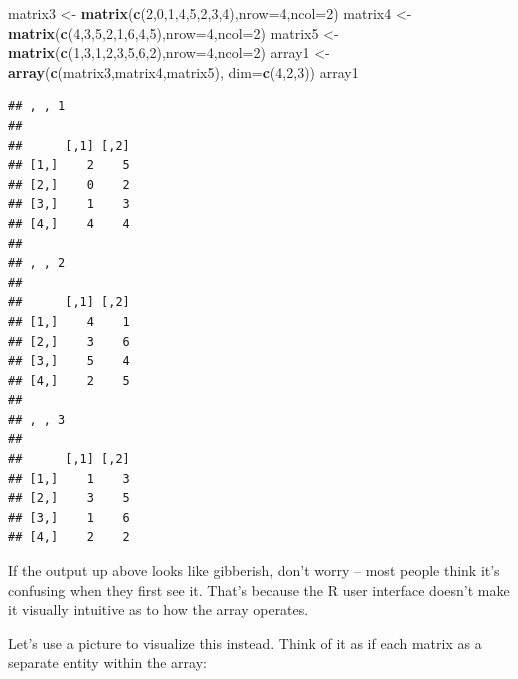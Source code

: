 \documentclass[
]{book}
\newenvironment{Shaded}{\begin{snugshade}}{\end{snugshade}}
\newcommand{\DataTypeTok}[1]{\textcolor[rgb]{0.13,0.29,0.53}{#1}}
\newcommand{\DecValTok}[1]{\textcolor[rgb]{0.00,0.00,0.81}{#1}}
\newcommand{\KeywordTok}[1]{\textcolor[rgb]{0.13,0.29,0.53}{\textbf{#1}}}
\newcommand{\NormalTok}[1]{#1}
\newcommand{\StringTok}[1]{\textcolor[rgb]{0.31,0.60,0.02}{#1}}
\begin{document}
\begin{Shaded}
\begin{Highlighting}[]
\NormalTok{matrix3 <-}\StringTok{ }\KeywordTok{matrix}\NormalTok{(}\KeywordTok{c}\NormalTok{(}\DecValTok{2}\NormalTok{,}\DecValTok{0}\NormalTok{,}\DecValTok{1}\NormalTok{,}\DecValTok{4}\NormalTok{,}\DecValTok{5}\NormalTok{,}\DecValTok{2}\NormalTok{,}\DecValTok{3}\NormalTok{,}\DecValTok{4}\NormalTok{),}\DataTypeTok{nrow=}\DecValTok{4}\NormalTok{,}\DataTypeTok{ncol=}\DecValTok{2}\NormalTok{)}
\NormalTok{matrix4 <-}\StringTok{ }\KeywordTok{matrix}\NormalTok{(}\KeywordTok{c}\NormalTok{(}\DecValTok{4}\NormalTok{,}\DecValTok{3}\NormalTok{,}\DecValTok{5}\NormalTok{,}\DecValTok{2}\NormalTok{,}\DecValTok{1}\NormalTok{,}\DecValTok{6}\NormalTok{,}\DecValTok{4}\NormalTok{,}\DecValTok{5}\NormalTok{),}\DataTypeTok{nrow=}\DecValTok{4}\NormalTok{,}\DataTypeTok{ncol=}\DecValTok{2}\NormalTok{)}
\NormalTok{matrix5 <-}\StringTok{ }\KeywordTok{matrix}\NormalTok{(}\KeywordTok{c}\NormalTok{(}\DecValTok{1}\NormalTok{,}\DecValTok{3}\NormalTok{,}\DecValTok{1}\NormalTok{,}\DecValTok{2}\NormalTok{,}\DecValTok{3}\NormalTok{,}\DecValTok{5}\NormalTok{,}\DecValTok{6}\NormalTok{,}\DecValTok{2}\NormalTok{),}\DataTypeTok{nrow=}\DecValTok{4}\NormalTok{,}\DataTypeTok{ncol=}\DecValTok{2}\NormalTok{)}
\NormalTok{array1 <-}\StringTok{ }\KeywordTok{array}\NormalTok{(}\KeywordTok{c}\NormalTok{(matrix3,matrix4,matrix5),}
                \DataTypeTok{dim=}\KeywordTok{c}\NormalTok{(}\DecValTok{4}\NormalTok{,}\DecValTok{2}\NormalTok{,}\DecValTok{3}\NormalTok{))}
\NormalTok{array1}
\end{Highlighting}
\end{Shaded}

\begin{verbatim}
## , , 1
## 
##      [,1] [,2]
## [1,]    2    5
## [2,]    0    2
## [3,]    1    3
## [4,]    4    4
## 
## , , 2
## 
##      [,1] [,2]
## [1,]    4    1
## [2,]    3    6
## [3,]    5    4
## [4,]    2    5
## 
## , , 3
## 
##      [,1] [,2]
## [1,]    1    3
## [2,]    3    5
## [3,]    1    6
## [4,]    2    2
\end{verbatim}

If the output up above looks like gibberish, don't worry -- most people think it's confusing when they first see it. That's because the R user interface doesn't make it visually intuitive as to how the array operates.

Let's use a picture to visualize this instead. Think of it as if each matrix as a separate entity within the array:
\end{document}
